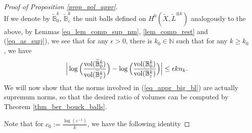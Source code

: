 \documentclass[12pt]{article}
\numberwithin{equation}{section}
\theoremstyle{theorem}
\theoremstyle{definition}
\theoremstyle{remark}
\newcommand{\nat}{\mathbb{N}}
\begin{document}
\begin{proof}[Proof of Proposition \ref{prop_pol_appr}]
\begin{equation}
		\end{equation}
		If we denote by $\widetilde{\mathbb{B}}_0^k$, $\widetilde{\mathbb{B}}_{\varepsilon}^k$ the unit balls defined on $H^0(\widetilde{X}, \widetilde{L}^{\otimes k})$ analogously to the above, by Lemmas \ref{eq_lem_comp_sup_nm}, \ref{lem_comp_rest} and (\ref{eq_as_surj}), we see that for any $\epsilon > 0$, there is $k_0 \in \nat$ such that for any $k \geq k_0$, we have
		\begin{equation}\label{eq_appr_big_bl}
			\Big|
			\log \Big( \frac{{\rm{vol}}(\widetilde{\mathbb{B}}_{0}^k)}{{\rm{vol}}(\widetilde{\mathbb{B}}_{\varepsilon}^k)} \Big)
			-
			\log \Big( \frac{{\rm{vol}}(\mathbb{B}_{0}^k)}{{\rm{vol}}(\mathbb{B}_{\varepsilon}^k)} \Big)
			\Big|
			\leq
			\epsilon k n_k.
		\end{equation}
		We will now show that the norms involved in (\ref{eq_appr_big_bl}) are actually supremum norms, so that the desired ratio of volumes can be computed by Theorem \ref{thm_ber_bouck_balls}.
		\par 

		Note that for $c_0 := \frac{\log(\varepsilon^{-1})}{k}$, we have the following identity

\end{proof}
\end{document}
